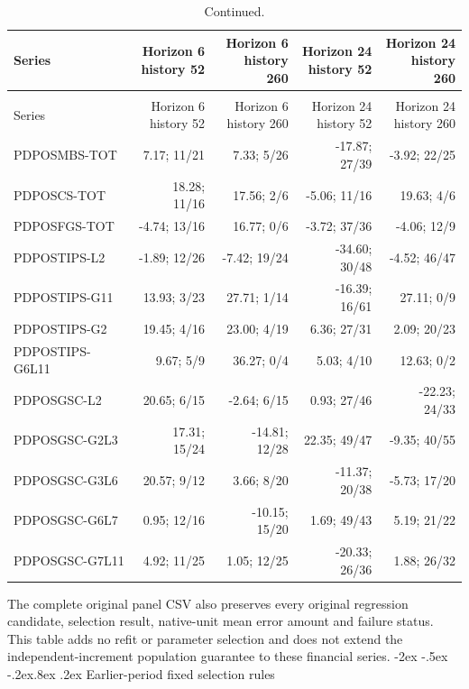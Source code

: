 \documentclass[10pt,a4paper]{article}
\makeatletter
\renewcommand\section{\@startsection{section}{1}{\z@}%
  {-2ex \@plus -.5ex \@minus -.2ex}{.8ex \@plus .2ex}%
  {\normalfont\large\bfseries}}
\makeatother
\begin{document}
\begin{longtable}{p{30mm}rrrr}
\caption{Every additional-panel endpoint-plug-in result. Fewer breaches do not guarantee a better score.}\\
\toprule
Series & \shortstack{Horizon 6\\history 52} & \shortstack{Horizon 6\\history 260} & \shortstack{Horizon 24\\history 52} & \shortstack{Horizon 24\\history 260} \\
\midrule
\endfirsthead
\caption[]{Continued.}\\
\toprule
Series & \shortstack{Horizon 6\\history 52} & \shortstack{Horizon 6\\history 260} & \shortstack{Horizon 24\\history 52} & \shortstack{Horizon 24\\history 260} \\
\midrule
\endhead
\bottomrule
\endfoot
PDPOSMBS-TOT & 7.17; 11/21 & 7.33; 5/26 & -17.87; 27/39 & -3.92; 22/25 \\
PDPOSCS-TOT & 18.28; 11/16 & 17.56; 2/6 & -5.06; 11/16 & 19.63; 4/6 \\
PDPOSFGS-TOT & -4.74; 13/16 & 16.77; 0/6 & -3.72; 37/36 & -4.06; 12/9 \\
PDPOSTIPS-L2 & -1.89; 12/26 & -7.42; 19/24 & -34.60; 30/48 & -4.52; 46/47 \\
PDPOSTIPS-G11 & 13.93; 3/23 & 27.71; 1/14 & -16.39; 16/61 & 27.11; 0/9 \\
PDPOSTIPS-G2 & 19.45; 4/16 & 23.00; 4/19 & 6.36; 27/31 & 2.09; 20/23 \\
PDPOSTIPS-G6L11 & 9.67; 5/9 & 36.27; 0/4 & 5.03; 4/10 & 12.63; 0/2 \\
PDPOSGSC-L2 & 20.65; 6/15 & -2.64; 6/15 & 0.93; 27/46 & -22.23; 24/33 \\
PDPOSGSC-G2L3 & 17.31; 15/24 & -14.81; 12/28 & 22.35; 49/47 & -9.35; 40/55 \\
PDPOSGSC-G3L6 & 20.57; 9/12 & 3.66; 8/20 & -11.37; 20/38 & -5.73; 17/20 \\
PDPOSGSC-G6L7 & 0.95; 12/16 & -10.15; 15/20 & 1.69; 49/43 & 5.19; 21/22 \\
PDPOSGSC-G7L11 & 4.92; 11/25 & 1.05; 12/25 & -20.33; 26/36 & 1.88; 26/32 \\
\end{longtable}
\endgroup

The complete original panel CSV also preserves every original
regression candidate, selection result, native-unit mean error amount and
failure status. This table adds no refit or parameter selection and does not
extend the independent-increment population guarantee to these financial
series.\section{Earlier-period fixed selection rules}\label{sup:selection}
\end{document}
